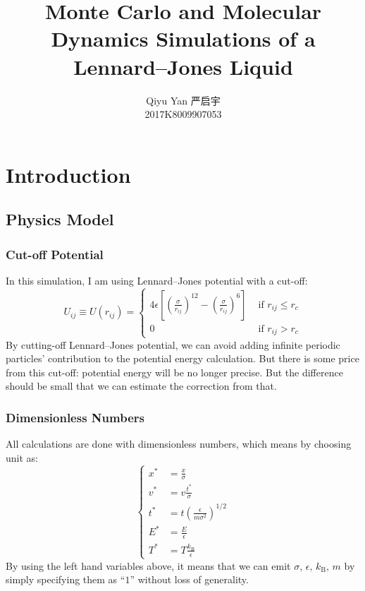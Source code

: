 \documentclass[UTF8,a4paper,no-math]{article}
\title{Monte Carlo and Molecular Dynamics Simulations of a Lennard–Jones Liquid}
\author{Qiyu Yan 严启宇\\ \small{2017K8009907053}}
\begin{document}
\maketitle

\tableofcontents
\section{Introduction}
\subsection{Physics Model}
\subsubsection{Cut-off Potential}
In this simulation, I am using Lennard–Jones potential with a cut-off:
\begin{equation}
	U_{i j} \equiv U\left(r_{i j}\right)=\left\{
	\begin{array}{cc}4 \epsilon\left[\left(\frac{\sigma}{r_{i j}}\right)^{12}-\left(\frac{\sigma}{r_{i j}}\right)^{6}\right] & \text { if } r_{i j} \leq r_{c} \\
		0                                                                                                           & \text { if } r_{i j}>r_{c}\end{array}
	\right.
	\label{eqn:l-j}
\end{equation}
By cutting-off Lennard–Jones potential, we can avoid adding infinite periodic particles' contribution to the potential energy calculation.
But there is some price from this cut-off: potential energy will be no longer precise. But the difference should be small that we can estimate the
correction from that.
\subsubsection{Dimensionless Numbers}
All calculations are done with dimensionless numbers, which means by choosing unit as:
\begin{equation}
	\left\{
	\begin{aligned}
		x^{*} & = \frac{x}{\sigma}                                   \\
		v^{*} & = v\frac{t^{*}}{\sigma}                              \\
		t^{*} & = t\left(\frac{\epsilon}{m \sigma^{2}} \right)^{1/2} \\
		E^{*} & = \frac{E}{\epsilon}                                 \\
		T^{*} & = T \frac{k_{\text{B}}}{\epsilon}
	\end{aligned}
	\right.
\end{equation}
By using the left hand variables above, it means that we can emit $\sigma, \, \epsilon, \, k_\text{B}, \, m$ by simply specifying them as ``$1$''
without loss of generality.
\end{document}

